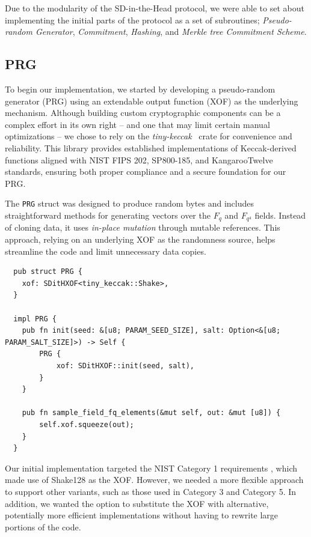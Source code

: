 \documentclass[11pt]{report}
\theoremstyle{definition}
\theoremstyle{plain}
\begin{document}
Due to the modularity of the SD-in-the-Head protocol, we were able to set about implementing the initial parts of the protocol as a set of subroutines; \textit{Pseudo-random Generator}, \textit{Commitment}, \textit{Hashing}, and \textit{Merkle tree Commitment Scheme}.

\subsection{PRG}\label{sub:prg}
To begin our implementation, we started by developing a pseudo-random generator (PRG) using an extendable output function (XOF) as the underlying mechanism. Although building custom cryptographic components can be a complex effort in its own right -- and one that may limit certain manual optimizations -- we chose to rely on the \textit{tiny-keccak}~\cite{tinykeccak} crate for convenience and reliability. This library provides established implementations of Keccak-derived functions aligned with NIST FIPS 202, SP800-185, and KangarooTwelve standards, ensuring both proper compliance and a secure foundation for our PRG.

The \texttt{PRG} struct was designed to produce random bytes and includes straightforward methods for generating vectors over the $F_q$ and $F_{q^4}$ fields. Instead of cloning data, it uses \emph{in-place mutation} through mutable references. This approach, relying on an underlying XOF as the randomness source, helps streamline the code and limit unnecessary data copies.

\begin{verbatim}
  pub struct PRG {
    xof: SDitHXOF<tiny_keccak::Shake>,
  }

  impl PRG {
    pub fn init(seed: &[u8; PARAM_SEED_SIZE], salt: Option<&[u8; PARAM_SALT_SIZE]>) -> Self {
        PRG {
            xof: SDitHXOF::init(seed, salt),
        }
    }

    pub fn sample_field_fq_elements(&mut self, out: &mut [u8]) {
        self.xof.squeeze(out);
    }
  }
\end{verbatim}

Our initial implementation targeted the NIST Category 1 requirements \cite{aguilarsyndrome11}, which made use of Shake128 \cite{aguilarsyndrome11} as the XOF. However, we needed a more flexible approach to support other variants, such as those used in Category 3 and Category 5. In addition, we wanted the option to substitute the XOF with alternative, potentially more efficient implementations without having to rewrite large portions of the code.
\end{document}
